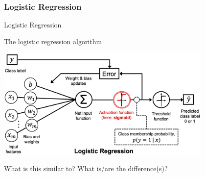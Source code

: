 \documentclass[aspectratio=169]{beamer}
\begin{document}
\begin{frame}
    \frametitle{Logistic Regression }
    \begin{center}
        {\LARGE Logistic Regression }
    \end{center}
\end{frame}

\begin{frame}{The logistic regression algorithm}
	\begin{center}    
		\includegraphics[width=0.8\textwidth]{figures/03_03.png}
	\end{center}
\vfill 
What is this similar to? What is/are the difference(s)?
\end{frame}
\end{document}
